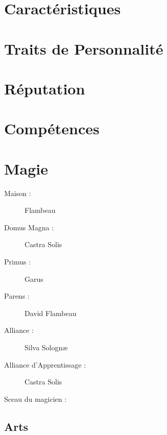 \section*{Caractéristiques}


\caractableMP

\begin{multicols*}{2}

\longVFQs

\section*{Traits de Personnalité}

\traitslong

\section*{Réputation}

\reputationslong



\section*{Compétences}

\abilitieslong

\end{multicols*}

\pagebreak

\section*{Magie}
\begin{multicols}{2}
\begin{description}
\item[Maison :] Flambeau
\item[Domus Magna :] Castra Solis
\item[Primus :] Garus
\item[Parens :] David Flambeau
\item[Alliance :] Silva Solognæ
\item[Alliance d'Apprentissage :] Castra Solis
\item[Sceau du magicien :] \magussigil
\end{description}
\end{multicols}
\subsection*{Arts}

